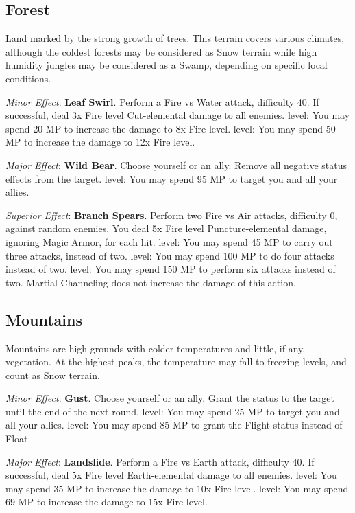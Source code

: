 \begin{multicols}{2}
\subsection*{Forest}\label{subsec:geo-forest}
Land marked by the strong growth of trees. This terrain covers various climates, although the coldest forests may be considered as Snow terrain while high humidity jungles may be considered as a Swamp, depending on specific local conditions.

\textit{Minor Effect}: \textbf{Leaf Swirl}. Perform a Fire vs Water attack, difficulty 40. If successful, deal 3x Fire level Cut-elemental damage to all enemies.  level: You may spend 20 MP to increase the damage to 8x Fire level.  level: You may spend 50 MP to increase the damage to 12x Fire level.

\textit{Major Effect}: \textbf{Wild Bear}. Choose yourself or an ally. Remove all negative status effects from the target.  level: You may spend 95 MP to target you and all your allies.

\textit{Superior Effect}: \textbf{Branch Spears}. Perform two Fire vs Air attacks, difficulty 0, against random enemies. You deal 5x Fire level Puncture-elemental damage, ignoring Magic Armor, for each hit.  level: You may spend 45 MP to carry out three attacks, instead of two.  level: You may spend 100 MP to do four attacks instead of two.  level: You may spend 150 MP to perform six attacks instead of two. Martial Channeling does not increase the damage of this action.

\subsection*{Mountains}\label{subsec:geo-mountain}
Mountains are high grounds with colder temperatures and little, if any, vegetation. At the highest peaks, the temperature may fall to freezing levels, and count as Snow terrain.

\textit{Minor Effect}: \textbf{Gust}. Choose yourself or an ally. Grant the  status to the target until the end of the next round.  level: You may spend 25 MP to target you and all your allies.  level: You may spend 85 MP to grant the Flight status instead of Float.

\textit{Major Effect}: \textbf{Landslide}. Perform a Fire vs Earth attack, difficulty 40. If successful, deal 5x Fire level Earth-elemental damage to all enemies.  level: You may spend 35 MP to increase the damage to 10x Fire level.  level: You may spend 69 MP to increase the damage to 15x Fire level.


\end{multicols}
